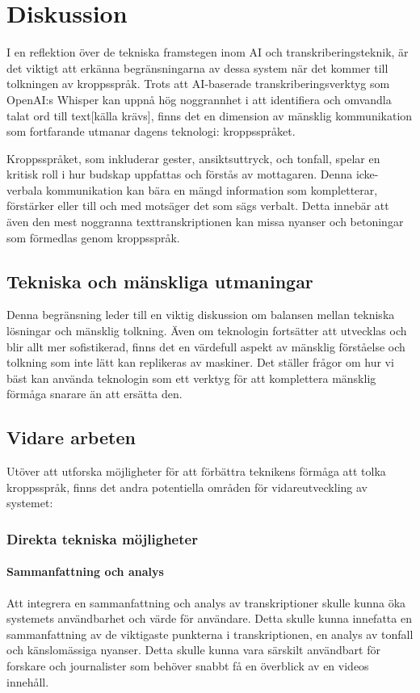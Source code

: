 \chapter{Diskussion}
I en reflektion över de tekniska framstegen inom AI och transkriberingsteknik, är
det viktigt att erkänna begränsningarna av dessa system när det kommer till
tolkningen av kroppsspråk. Trots att AI-baserade transkriberingsverktyg som
OpenAI:s Whisper kan uppnå hög noggrannhet i att identifiera och omvandla
talat ord till text[källa krävs], finns det en dimension av mänsklig kommunikation som
fortfarande utmanar dagens teknologi: kroppsspråket.

Kroppsspråket, som inkluderar gester, ansiktsuttryck, och tonfall, spelar en
kritisk roll i hur budskap uppfattas och förstås av mottagaren. Denna
icke-verbala kommunikation kan bära en mängd information som kompletterar,
förstärker eller till och med motsäger det som sägs verbalt. Detta innebär att
även den mest noggranna texttranskriptionen kan missa nyanser och betoningar
som förmedlas genom kroppsspråk.

\section{Tekniska och mänskliga utmaningar}
Denna begränsning leder till en viktig diskussion om balansen mellan tekniska
lösningar och mänsklig tolkning. Även om teknologin fortsätter att utvecklas
och blir allt mer sofistikerad, finns det en värdefull aspekt av mänsklig
förståelse och tolkning som inte lätt kan replikeras av maskiner. Det ställer
frågor om hur vi bäst kan använda teknologin som ett verktyg för att
komplettera mänsklig förmåga snarare än att ersätta den.

\section{Vidare arbeten}
Utöver att utforska möjligheter för att förbättra teknikens förmåga att tolka
kroppsspråk, finns det andra potentiella områden för vidareutveckling av
systemet:

\subsection{Direkta tekniska möjligheter}

\subsubsection{Sammanfattning och analys}
Att integrera en sammanfattning och analys av transkriptioner skulle kunna
öka systemets användbarhet och värde för användare. Detta skulle kunna
innefatta en sammanfattning av de viktigaste punkterna i transkriptionen, en
analys av tonfall och känslomässiga nyanser. Detta skulle kunna vara särskilt
användbart för forskare och journalister som behöver snabbt få en överblick av
en videos innehåll.

